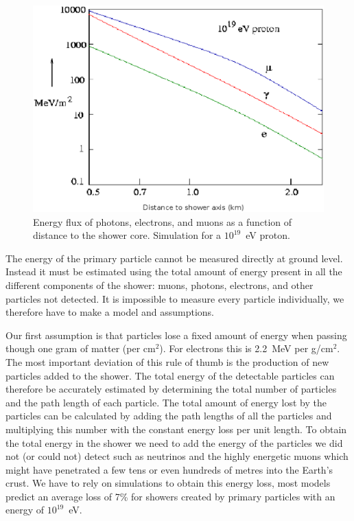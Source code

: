 \documentclass[12pt,a4paper]{article}
\numberwithin{equation}{section}
\numberwithin{figure}{section}
\numberwithin{table}{section}
\begin{document}
\begin{figure}\begin{center}
\includegraphics[scale=0.5]{profile_flux.eps}%
\caption{Energy flux of photons, electrons, and muons as a function of distance to the shower core. Simulation for a $10^{19}$~eV proton.}\label{fig:profile_flux}
\end{center}\end{figure}

The energy of the primary particle cannot be measured directly at ground level. Instead it must be estimated using the total amount of energy present in all the different components of the shower: muons, photons, electrons, and other particles not detected. It is impossible to measure every particle individually, we therefore have to make a model and assumptions.

Our first assumption is that particles lose a fixed amount of energy when passing though one gram of matter (per cm$^2$). For electrons this is 2.2~MeV per g/cm$^2$. The most important deviation of this rule of thumb is the production of new particles added to the shower. The total energy of the detectable particles can therefore be accurately estimated by determining the total number of particles and the path length of each particle. The total amount of energy lost by the particles can be calculated by adding the path lengths of all the particles and multiplying this number with the constant energy loss per unit length. To obtain the total energy in the shower we need to add the energy of the particles we did not (or could not) detect such as neutrinos and the highly energetic muons which might have penetrated a few tens or even hundreds of metres into the Earth's crust. We have to rely on simulations to obtain this energy loss, most models predict an average loss of 7\% for showers created by primary particles with an energy of $10^{19}$~eV.
\end{document}
